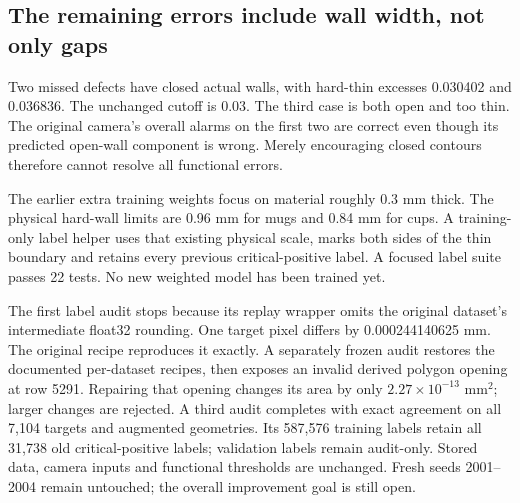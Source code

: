 \documentclass[10pt,letterpaper]{article}
\begin{document}
\subsection*{The remaining errors include wall width, not only gaps}
Two missed defects have closed actual walls, with hard-thin excesses 0.030402 and
0.036836. The unchanged cutoff is 0.03. The third case is both open and too thin.
The original camera's overall alarms on the first two are correct even though
its predicted open-wall component is wrong. Merely encouraging closed contours
therefore cannot resolve all functional errors.

The earlier extra training weights focus on material roughly 0.3 mm thick.
The physical hard-wall limits are 0.96 mm for mugs and 0.84 mm for cups. A training-only
label helper uses that existing physical scale, marks both sides of the thin
boundary and retains every previous critical-positive label. A focused label
suite passes 22 tests. No new weighted model has been trained yet.

The first label audit stops because its replay wrapper omits the original
dataset's intermediate float32 rounding. One target pixel differs by
0.000244140625 mm. The original recipe reproduces it exactly. A separately frozen
audit restores the documented per-dataset recipes, then exposes an invalid
derived polygon opening at row 5291. Repairing that opening changes its area by
only $2.27\times10^{-13}$ mm$^2$; larger changes are rejected. A third audit
completes with exact agreement on all 7,104 targets and augmented geometries.
Its 587,576 training labels retain all 31,738 old critical-positive labels;
validation labels remain audit-only. Stored data, camera inputs and functional
thresholds are unchanged.
Fresh seeds 2001--2004 remain untouched; the overall improvement goal is still open.
\end{document}
